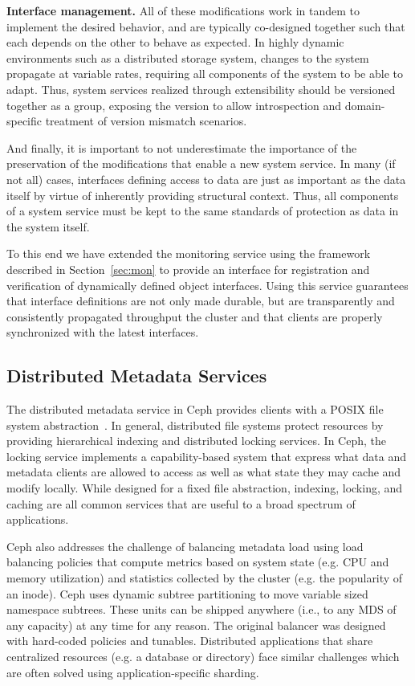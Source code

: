 \documentclass[preprint]{sigplanconf-eurosys}
\begin{document}
{\bf Interface management.} All of these modifications work in tandem to
implement the desired behavior, and are typically co-designed together such
that each depends on the other to behave as expected. In highly dynamic
environments such as a distributed storage system, changes to the system
propagate at variable rates, requiring all components of the system to be able
to adapt. Thus, system services realized through extensibility should be
versioned together as a group, exposing the version to allow introspection and
domain-specific treatment of version mismatch scenarios.

And finally, it is important to not underestimate the importance of the
preservation of the modifications that enable a new system service. In many
(if not all) cases, interfaces defining access to data are just as important
as the data itself by virtue of inherently providing structural context. Thus,
all components of a system service must be kept to the same standards of
protection as data in the system itself.

To this end we have extended the monitoring service using the framework
described in Section~\ref{sec:mon} to provide an interface for registration
and verification of dynamically defined object interfaces. Using this service
guarantees that interface definitions are not only made durable, but are
transparently and consistently propagated throughput the cluster and that
clients are properly synchronized with the latest interfaces.

\subsection{Distributed Metadata Services}
\label{malacology:mds}

The distributed metadata service in Ceph provides clients with a POSIX file
system abstraction~\cite{weil:sc2004-dyn-metadata}. In general, distributed
file systems protect resources by providing hierarchical indexing and
distributed locking services.  In Ceph, the locking service implements a
capability-based system that express what data and metadata clients are allowed
to access as well as what state they may cache and modify locally. While
designed for a fixed file abstraction, indexing, locking, and caching are all
common services that are useful to a broad spectrum of applications.

Ceph also addresses the challenge of balancing metadata load using load
balancing policies that compute metrics based on system state (e.g.  CPU and
memory utilization) and statistics collected by the cluster (e.g. the
popularity of an inode). Ceph uses dynamic subtree partitioning to move
variable sized namespace subtrees. These units can be shipped anywhere (i.e.,
to any MDS of any capacity) at any time for any reason. The original balancer
was designed with hard-coded policies and tunables.  Distributed applications
that share centralized resources (e.g. a database or directory) face similar
challenges which are often solved using application-specific sharding. 
\end{document}
